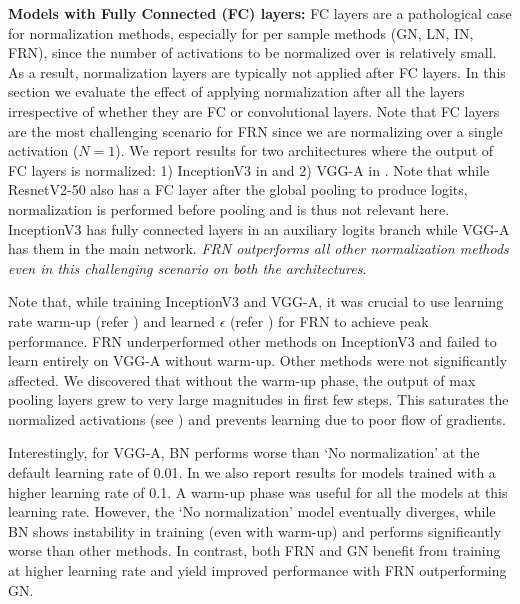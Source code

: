 \documentclass[10pt,twocolumn,letterpaper]{article}
\newcommand{\papername}{FRN}
\newcommand{\batchnorm}{BN}
\begin{document}
\medskip
\noindent
\textbf{Models with Fully Connected (FC) layers:}
FC layers are a pathological case for normalization methods, especially for per sample methods (GN, LN, IN, \papername{}), since the number of activations to be normalized over is relatively small. As a result, normalization layers are typically not applied after FC layers. In this section we evaluate the effect of applying normalization after all the layers irrespective of whether they are FC or convolutional layers.
Note that FC layers are the most challenging scenario for \papername{} since we are normalizing over a single activation ($N=1$). We report results for two architectures where the output of FC layers is normalized: 1) InceptionV3 in  and 2) VGG-A in . Note that while ResnetV2-50 also has a FC layer after the global pooling to produce logits, normalization is performed before pooling and is thus not relevant here. InceptionV3 has fully connected layers in an auxiliary logits branch while VGG-A has them in the main network. \emph{\papername{} outperforms all other normalization methods even in this challenging scenario on both the architectures}.

Note that, while training InceptionV3 and VGG-A, it was crucial to use learning rate warm-up (refer ) and learned $\epsilon$ (refer ) for \papername{} to achieve peak performance. \papername{} underperformed other methods on InceptionV3 and failed to learn entirely on VGG-A without warm-up. Other methods were not significantly affected.
We discovered that without the warm-up phase, the output of max pooling layers grew to very large magnitudes in first few steps. This saturates the normalized activations (see ) and prevents learning due to poor flow of gradients.

Interestingly, for VGG-A, \batchnorm{} performs worse than `No normalization' at the default learning rate of 0.01. In  we also report results for models trained with a higher learning rate of 0.1. A warm-up phase was useful for all the models at this learning rate. However, the `No normalization' model eventually diverges, while \batchnorm{} shows instability in training (even with warm-up) and performs significantly worse than other methods. In contrast, both \papername{} and GN benefit from training at higher learning rate and yield improved performance with \papername{} outperforming GN.
\end{document}
